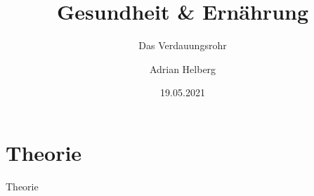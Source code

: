 \documentclass[xcolor=dvipsnames]{beamer}
\title{Gesundheit \& Ernährung}
\subtitle{Das Verdauungsrohr}
\author{Adrian Helberg}
\date{19.05.2021}
\begin{document}
    \maketitle


    \section{Theorie}
    {
    \begin{frame}
        \begin{center}
            \Huge Theorie
        \end{center}
    \end{frame}
    }
\end{document}
